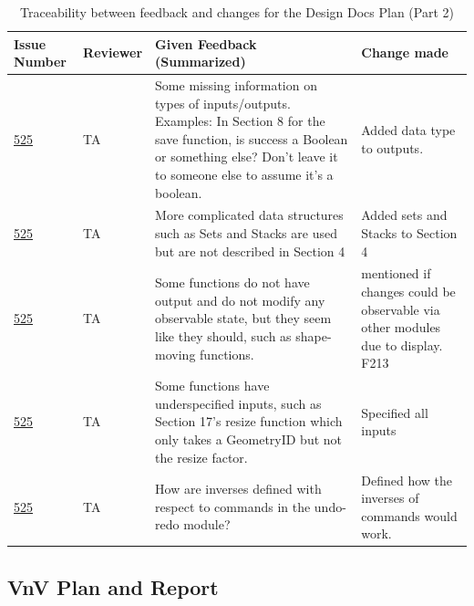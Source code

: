 \documentclass{article}
\begin{document}
\begin{table}[H]
\centering
\begin{tabularx}{\textwidth}{p{1.3cm} l X X}
\toprule
Issue Number & Reviewer & Given Feedback (Summarized) & Change made  \\
\midrule
\href{https://github.com/ritual-17/flow/issues/525}{525} & TA & Some missing information on types of inputs/outputs. Examples:
In Section 8 for the save function, is success a Boolean or something else? Don't leave it to someone else to assume it's a boolean.
 & Added data type to outputs. \\

\href{https://github.com/ritual-17/flow/issues/525}{525} & TA &
More complicated data structures such as Sets and Stacks are used but are not described in Section 4
 & Added sets and Stacks to Section 4 \\

\href{https://github.com/ritual-17/flow/issues/525}{525} & TA & Some functions do not have output and do not modify any observable state, but they seem like they should, such as shape-moving functions.
 & mentioned if changes could be observable via other modules due to display.
F213 \\

\href{https://github.com/ritual-17/flow/issues/525}{525} & TA & Some functions have underspecified inputs, such as Section 17's resize function which only takes a GeometryID but not the resize factor.
& Specified all inputs \\

\href{https://github.com/ritual-17/flow/issues/525}{525} & TA & How are inverses defined with respect to commands in the undo-redo module?
& Defined how the inverses of commands would work. \\

\bottomrule
\end{tabularx}
\caption{Traceability between feedback and changes for the Design Docs Plan (Part 2)}
\end{table}


\subsection{VnV Plan and Report}
\end{document}
